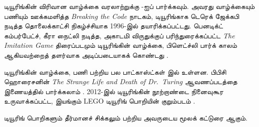 \documentclass[../../../include/open-logic-section]{subfiles}
\begin{document}
\begin{reading}
டியூரிங்கின் விரிவான வாழ்க்கை வரலாற்றுக்கு \citet{Hodges2014}-ஐப்
பார்க்கவும். அவரது வாழ்க்கையும் பணியும் ஊக்கமளித்த \emph{Breaking
  the Code} நாடகம், டியூரிங்காக டெரெக் ஜேக்கபி நடித்த தொலைக்காட்சி
நிகழ்ச்சியாக 1996-இல் தயாரிக்கப்பட்டது. பெனடிக்ட் கம்பர்பேட்ச்,
கீரா நைட்லி நடித்த, அகாடமி விருதுக்குப் பரிந்துரைக்கப்பட்ட
\emph{The Imitation Game} திரைப்படமும் டியூரிங்கின் வாழ்க்கை,
பிளெட்ச்லி பார்க் காலம் ஆகியவற்றைத் தளர்வாக அடிப்படையாகக் கொண்டது
\citep{Imitation2014}.

டியூரிங்கின் வாழ்க்கை, பணி பற்றிய பல பாட்காஸ்ட்கள் \citet{Radiolab2012}
இல் உள்ளன. பிபிசி ஹொரைசனின் \emph{The Strange Life and Death of
  Dr.~Turing} ஆவணப்படத்தை இணையத்தில் பார்க்கலாம் \citep{Sykes1992}.
2012-இல் டியூரிங்கின் நூற்றாண்டை நினைவுகூர உருவாக்கப்பட்ட,
இயங்கும் LEGO டியூரிங் பொறியின் குறும்படம் \citep{Theelen2012}.

டியூரிங் பொறிகளும் தீர்மானச் சிக்கலும் பற்றிய அவருடைய மூலக் கட்டுரை
\citet{Turing1937} ஆகும்.
\end{reading}
\end{document}
